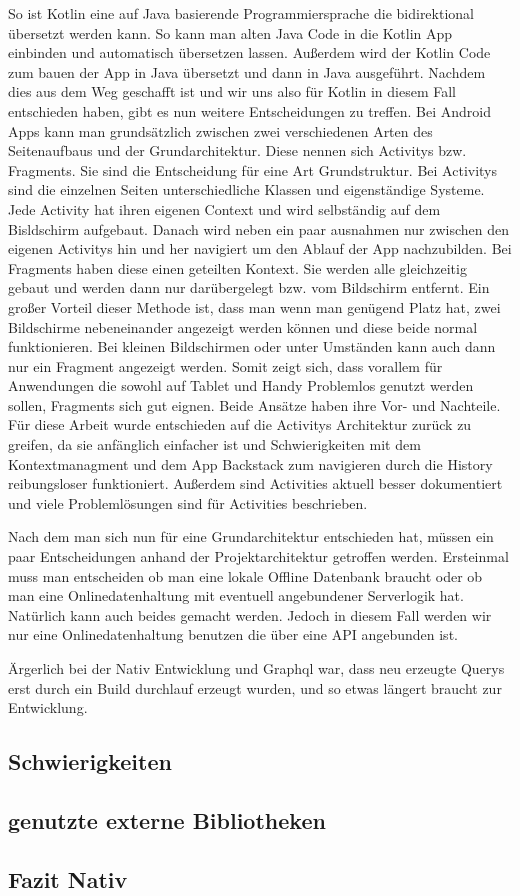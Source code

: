  So ist Kotlin eine auf Java basierende Programmiersprache die bidirektional übersetzt werden kann. So kann man alten Java Code in die Kotlin App einbinden und automatisch übersetzen lassen. Außerdem wird der Kotlin Code zum bauen der App in Java übersetzt und dann in Java ausgeführt.
Nachdem dies aus dem Weg geschafft ist und wir uns also für Kotlin in diesem Fall entschieden haben, gibt es nun weitere Entscheidungen zu treffen. Bei Android Apps kann man grundsätzlich zwischen zwei verschiedenen Arten des Seitenaufbaus und der Grundarchitektur. 
Diese nennen sich Activitys bzw. Fragments. Sie sind die Entscheidung für eine Art Grundstruktur. Bei Activitys sind die einzelnen Seiten unterschiedliche Klassen und eigenständige Systeme. Jede Activity hat ihren eigenen Context und wird selbständig auf dem Bisldschirm aufgebaut. Danach wird neben ein paar ausnahmen nur zwischen den eigenen Activitys hin und her navigiert um den Ablauf der App nachzubilden.
Bei Fragments haben diese einen geteilten Kontext. Sie werden alle gleichzeitig gebaut und werden dann nur darübergelegt bzw. vom Bildschirm entfernt. Ein großer Vorteil dieser Methode ist, dass man wenn man genügend Platz hat, zwei Bildschirme nebeneinander angezeigt werden können und diese beide normal funktionieren. Bei kleinen Bildschirmen oder unter Umständen kann auch dann nur ein Fragment angezeigt werden. Somit zeigt sich, dass vorallem für Anwendungen die sowohl auf Tablet und Handy Problemlos genutzt werden sollen, Fragments sich gut eignen.
Beide Ansätze haben ihre Vor- und Nachteile.
Für diese Arbeit wurde entschieden auf die Activitys Architektur zurück zu greifen, da sie anfänglich einfacher ist und Schwierigkeiten mit dem Kontextmanagment und dem App Backstack zum navigieren durch die History reibungsloser funktioniert. Außerdem sind Activities aktuell besser dokumentiert und viele Problemlösungen sind für Activities beschrieben.

Nach dem man sich nun für eine Grundarchitektur entschieden hat, müssen ein paar Entscheidungen anhand der Projektarchitektur getroffen werden. Ersteinmal muss man entscheiden ob man eine lokale Offline Datenbank braucht oder ob man eine Onlinedatenhaltung mit eventuell angebundener Serverlogik hat. Natürlich kann auch beides gemacht werden. Jedoch in diesem Fall werden wir nur eine Onlinedatenhaltung benutzen die über eine API angebunden ist. 


Ärgerlich bei der Nativ Entwicklung und Graphql war, dass neu erzeugte Querys erst durch ein Build durchlauf erzeugt wurden, und so etwas längert braucht zur Entwicklung.

\subsection{Schwierigkeiten}
\subsection{genutzte externe Bibliotheken}
\subsection{Fazit Nativ}